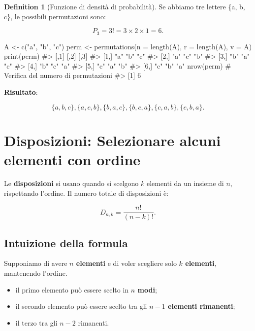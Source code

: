 \documentclass[
  letterpaper,
  DIV=11,
  numbers=noendperiod,
  oneside]{scrreprt}
\newenvironment{Shaded}{\begin{snugshade}}{\end{snugshade}}
\newcommand{\AttributeTok}[1]{\textcolor[rgb]{0.40,0.45,0.13}{#1}}
\newcommand{\CommentTok}[1]{\textcolor[rgb]{0.37,0.37,0.37}{#1}}
\newcommand{\FunctionTok}[1]{\textcolor[rgb]{0.28,0.35,0.67}{#1}}
\newcommand{\NormalTok}[1]{\textcolor[rgb]{0.00,0.23,0.31}{#1}}
\newcommand{\OtherTok}[1]{\textcolor[rgb]{0.00,0.23,0.31}{#1}}
\newcommand{\StringTok}[1]{\textcolor[rgb]{0.13,0.47,0.30}{#1}}
\providecommand{\tightlist}{%
  \setlength{\itemsep}{0pt}\setlength{\parskip}{0pt}}
\theoremstyle{definition}
\theoremstyle{plain}
\theoremstyle{definition}
\newtheorem{definition}{Definition}[chapter]
\theoremstyle{remark}
\begin{document}
\begin{definition}[Funzione di densità di
probabilità]
Se abbiamo tre lettere \{a, b, c\}, le possibili permutazioni sono:

\[
P_3 = 3! = 3 \times 2 \times 1 = 6.
\]

\begin{Shaded}
\begin{Highlighting}[]
\NormalTok{A }\OtherTok{\textless{}{-}} \FunctionTok{c}\NormalTok{(}\StringTok{"a"}\NormalTok{, }\StringTok{"b"}\NormalTok{, }\StringTok{"c"}\NormalTok{)}
\NormalTok{perm }\OtherTok{\textless{}{-}} \FunctionTok{permutations}\NormalTok{(}\AttributeTok{n =} \FunctionTok{length}\NormalTok{(A), }\AttributeTok{r =} \FunctionTok{length}\NormalTok{(A), }\AttributeTok{v =}\NormalTok{ A)}
\FunctionTok{print}\NormalTok{(perm)}
\CommentTok{\#\textgreater{}      [,1] [,2] [,3]}
\CommentTok{\#\textgreater{} [1,] "a"  "b"  "c" }
\CommentTok{\#\textgreater{} [2,] "a"  "c"  "b" }
\CommentTok{\#\textgreater{} [3,] "b"  "a"  "c" }
\CommentTok{\#\textgreater{} [4,] "b"  "c"  "a" }
\CommentTok{\#\textgreater{} [5,] "c"  "a"  "b" }
\CommentTok{\#\textgreater{} [6,] "c"  "b"  "a"}
\FunctionTok{nrow}\NormalTok{(perm)  }\CommentTok{\# Verifica del numero di permutazioni}
\CommentTok{\#\textgreater{} [1] 6}
\end{Highlighting}
\end{Shaded}

\textbf{Risultato}:

\[
\{a, b, c\}, \{a, c, b\}, \{b, a, c\}, \{b, c, a\}, \{c, a, b\}, \{c, b, a\}.
\]

\section{Disposizioni: Selezionare alcuni elementi con
ordine}\label{disposizioni-selezionare-alcuni-elementi-con-ordine}

Le \textbf{disposizioni} si usano quando si scelgono \(k\) elementi da
un insieme di \(n\), rispettando l'ordine. Il numero totale di
disposizioni è:

\[
D_{n,k} = \frac{n!}{(n-k)!} .
\]

\subsection{Intuizione della formula}\label{intuizione-della-formula-1}

Supponiamo di avere \textbf{\(n\) elementi} e di voler scegliere solo
\textbf{\(k\) elementi}, mantenendo l'ordine.

\begin{itemize}
\tightlist
\item
  il primo elemento può essere scelto in \textbf{\(n\) modi};
\item
  il secondo elemento può essere scelto tra gli \textbf{\(n-1\) elementi
  rimanenti};\\
\item
  il terzo tra gli \textbf{\(n-2\)} rimanenti.
\end{itemize}


\end{definition}
\end{document}
